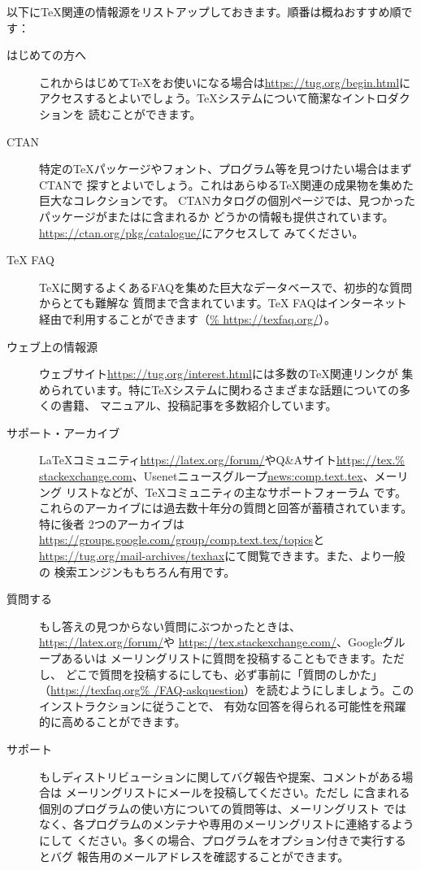\documentclass[uplatex,dvipdfmx]{jsarticle}
\begin{document}
以下に\TeX 関連の情報源をリストアップしておきます。順番は概ねおすすめ順です：
%
\begin{description}
\item[はじめての方へ]
これからはじめて\TeX をお使いになる場合は\url{https://tug.org/begin.html}に
アクセスするとよいでしょう。\TeX システムについて簡潔なイントロダクションを
読むことができます。

\item[CTAN]
特定の\TeX パッケージやフォント、プログラム等を見つけたい場合はまずCTANで
探すとよいでしょう。これはあらゆる\TeX 関連の成果物を集めた巨大なコレクションです。
CTANカタログの個別ページでは、見つかったパッケージが\TL または\MIKTEX に含まれるか
どうかの情報も提供されています。\url{https://ctan.org/pkg/catalogue/}にアクセスして
みてください。

\item[{\TeX} FAQ]
\TeX に関するよくあるFAQを集めた巨大なデータベースで、初歩的な質問からとても難解な
質問まで含まれています。{\TeX} FAQはインターネット経由で利用することができます（\url{%
https://texfaq.org/}）。

\item[ウェブ上の情報源]
ウェブサイト\url{https://tug.org/interest.html}には多数の\TeX 関連リンクが
集められています。特に\TeX システムに関わるさまざまな話題についての多くの書籍、
マニュアル、投稿記事を多数紹介しています。

\item[サポート・アーカイブ]
\LaTeX コミュニティ\url{https://latex.org/forum/}やQ\&Aサイト\url{https://tex.%
stackexchange.com}、Usenetニュースグループ\url{news:comp.text.tex}、メーリング
リストなどが、\TeX コミュニティの主なサポートフォーラム
です。これらのアーカイブには過去数十年分の質問と回答が蓄積されています。特に後者
2つのアーカイブは\url{https://groups.google.com/group/comp.text.tex/topics}と
\url{https://tug.org/mail-archives/texhax}にて閲覧できます。また、より一般の
検索エンジンももちろん有用です。

\item[質問する]
もし答えの見つからない質問にぶつかったときは、\url{https://latex.org/forum/}や
\url{https://tex.stackexchange.com/}、Googleグループあるいは
メーリングリストに質問を投稿することもできます。ただし、
どこで質問を投稿するにしても、必ず事前に「質問のしかた」（\url{https://texfaq.org%
/FAQ-askquestion}）を読むようにしましょう。このインストラクションに従うことで、
有効な回答を得られる可能性を飛躍的に高めることができます。

\item[\TL サポート]
もし\TL ディストリビューションに関してバグ報告や提案、コメントがある場合は
\TL メーリングリストにメールを投稿してください。ただし
\TL に含まれる個別のプログラムの使い方についての質問等は、\TL メーリングリスト
ではなく、各プログラムのメンテナや専用のメーリングリストに連絡するようにして
ください。多くの場合、プログラムをオプション付きで実行するとバグ
報告用のメールアドレスを確認することができます。
\end{description}
\end{document}
